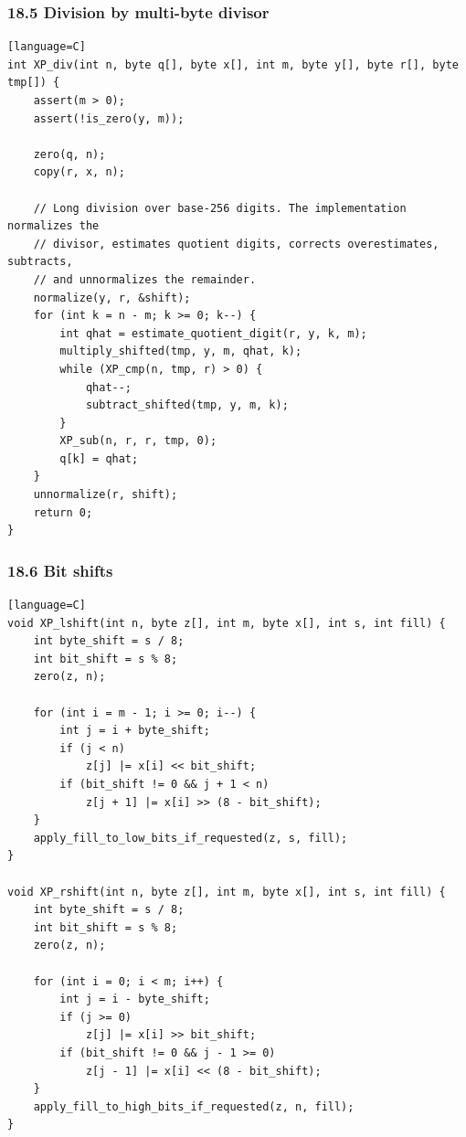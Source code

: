 \documentclass[11pt]{article}
\begin{document}
\subsubsection{18.5 Division by multi-byte divisor}\label{division-by-multi-byte-divisor}

\begin{verbatim}[language=C]
int XP_div(int n, byte q[], byte x[], int m, byte y[], byte r[], byte tmp[]) {
    assert(m > 0);
    assert(!is_zero(y, m));

    zero(q, n);
    copy(r, x, n);

    // Long division over base-256 digits. The implementation normalizes the
    // divisor, estimates quotient digits, corrects overestimates, subtracts,
    // and unnormalizes the remainder.
    normalize(y, r, &shift);
    for (int k = n - m; k >= 0; k--) {
        int qhat = estimate_quotient_digit(r, y, k, m);
        multiply_shifted(tmp, y, m, qhat, k);
        while (XP_cmp(n, tmp, r) > 0) {
            qhat--;
            subtract_shifted(tmp, y, m, k);
        }
        XP_sub(n, r, r, tmp, 0);
        q[k] = qhat;
    }
    unnormalize(r, shift);
    return 0;
}
\end{verbatim}

\subsubsection{18.6 Bit shifts}\label{bit-shifts}

\begin{verbatim}[language=C]
void XP_lshift(int n, byte z[], int m, byte x[], int s, int fill) {
    int byte_shift = s / 8;
    int bit_shift = s % 8;
    zero(z, n);

    for (int i = m - 1; i >= 0; i--) {
        int j = i + byte_shift;
        if (j < n)
            z[j] |= x[i] << bit_shift;
        if (bit_shift != 0 && j + 1 < n)
            z[j + 1] |= x[i] >> (8 - bit_shift);
    }
    apply_fill_to_low_bits_if_requested(z, s, fill);
}

void XP_rshift(int n, byte z[], int m, byte x[], int s, int fill) {
    int byte_shift = s / 8;
    int bit_shift = s % 8;
    zero(z, n);

    for (int i = 0; i < m; i++) {
        int j = i - byte_shift;
        if (j >= 0)
            z[j] |= x[i] >> bit_shift;
        if (bit_shift != 0 && j - 1 >= 0)
            z[j - 1] |= x[i] << (8 - bit_shift);
    }
    apply_fill_to_high_bits_if_requested(z, n, fill);
}
\end{verbatim}
\end{document}
